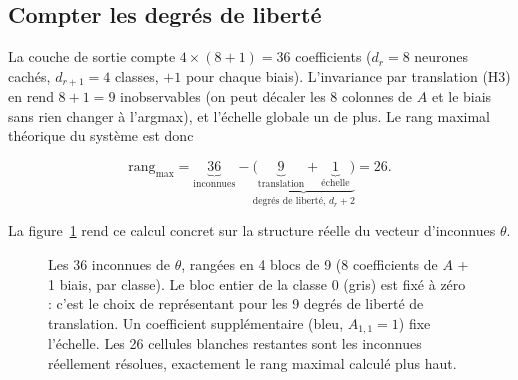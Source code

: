 \documentclass[11pt]{article}
\begin{document}
\subsection{Compter les degrés de liberté}

La couche de sortie compte $4 \times (8+1) = 36$ coefficients
($d_r = 8$ neurones cachés, $d_{r+1} = 4$ classes, $+1$ pour chaque biais).
L'invariance par translation (H3) en rend $8+1=9$ inobservables (on peut
décaler les 8 colonnes de $A$ et le biais sans rien changer à l'argmax), et
l'échelle globale un de plus. Le rang maximal théorique du système est donc

\[
  \text{rang}_{\max} = \underbrace{36}_{\text{inconnues}} -
  \underbrace{\big(\underbrace{9}_{\text{translation}} +
  \underbrace{1}_{\text{échelle}}\big)}_{\text{degrés de liberté, } d_r+2} = 26.
\]

La figure~\ref{fig:kernel} rend ce calcul concret sur la structure réelle du
vecteur d'inconnues $\theta$.

\begin{figure}[h]
\centering
{}
\caption{Les 36 inconnues de $\theta$, rangées en 4 blocs de 9 (8 coefficients
de $A$ + 1 biais, par classe). Le bloc entier de la classe 0 (gris) est fixé
à zéro : c'est le choix de représentant pour les 9 degrés de liberté de
translation. Un coefficient supplémentaire (bleu, $A_{1,1}=1$) fixe
l'échelle. Les 26 cellules blanches restantes sont les inconnues réellement
résolues, exactement le rang maximal calculé plus haut.}
\label{fig:kernel}
\end{figure}
\end{document}
